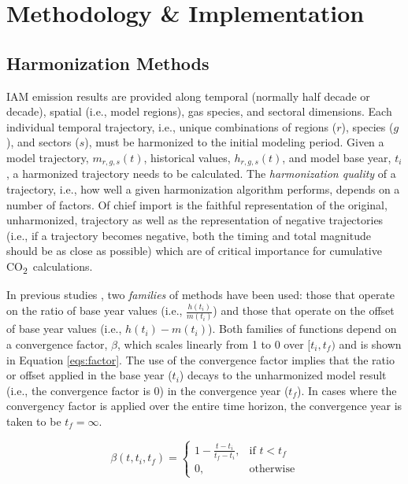 \documentclass[review]{elsarticle}
\newcommand{\cotwo}{CO\textsubscript{2}~}
\begin{document}
\section{Methodology \& Implementation}\label{sec:meths}

\subsection{Harmonization Methods}

IAM emission results are provided along temporal (normally half decade or
decade), spatial (i.e., model regions), gas species, and sectoral
dimensions. Each individual temporal trajectory, i.e., unique combinations of
regions ($r$), species ($g$), and sectors ($s$), must be harmonized to the
initial modeling period. Given a model trajectory, $m_{r, g, s}(t)$, historical
values, $h_{r, g, s}(t)$, and model base year, $t_i$, a harmonized trajectory
needs to be calculated. The \textit{harmonization quality} of a trajectory,
i.e., how well a given harmonization algorithm performs, depends on a number of
factors. Of chief import is the faithful representation of the original,
unharmonized, trajectory as well as the representation of negative trajectories
(i.e., if a trajectory becomes negative, both the timing and total magnitude
should be as close as possible) which are of critical importance for cumulative
\cotwo calculations.

In previous studies \cite{meinshausen_rcp_2011,rogelj_discrepancies_2011}, two
\textit{families} of methods have been used: those that operate on the ratio of
base year values (i.e., $\frac{h(t_i)}{m(t_i)}$) and those that operate on the
offset of base year values (i.e., $h(t_i) - m(t_i)$). Both families of functions
depend on a convergence factor, $\beta$, which scales linearly from 1 to 0 over
$[t_i, t_f)$ and is shown in Equation \ref{eqs:factor}. The use of the
  convergence factor implies that the ratio or offset applied in the base year
  ($t_i$) decays to the unharmonized model result (i.e., the convergence factor
  is 0) in the convergence year ($t_f$). In cases where the convergency factor
  is applied over the entire time horizon, the convergence year is taken to be
  $t_f = \infty$.

\begin{equation}\label{eqs:factor}
  \beta(t, t_i, t_f) =
  \begin{cases}
    1 - \frac{t - t_i}{t_f - t_i},& \text{if } t < t_f\\
    0,                        & \text{otherwise}
  \end{cases}
\end{equation}
\end{document}

